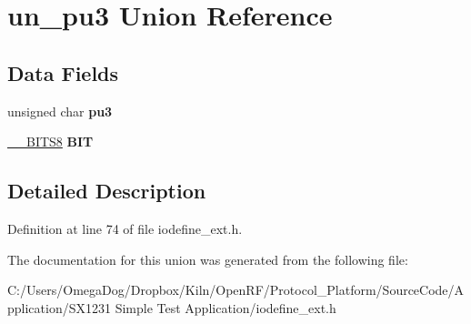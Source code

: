 \hypertarget{unionun__pu3}{\section{un\-\_\-pu3 Union Reference}
\label{unionun__pu3}
}
\subsection*{Data Fields}
\begin{DoxyCompactItemize}
\item 
\hypertarget{unionun__pu3_adb430128d0ebad9976440e08346e2280}{unsigned char {\bfseries pu3}}\label{unionun__pu3_adb430128d0ebad9976440e08346e2280}

\item 
\hypertarget{unionun__pu3_aac741832d190ccc6afff361975958412}{\hyperlink{struct_____b_i_t_s8}{\-\_\-\-\_\-\-B\-I\-T\-S8} {\bfseries B\-I\-T}}\label{unionun__pu3_aac741832d190ccc6afff361975958412}

\end{DoxyCompactItemize}


\subsection{Detailed Description}


Definition at line 74 of file iodefine\-\_\-ext.\-h.



The documentation for this union was generated from the following file\-:\begin{DoxyCompactItemize}
\item 
C\-:/\-Users/\-Omega\-Dog/\-Dropbox/\-Kiln/\-Open\-R\-F/\-Protocol\-\_\-\-Platform/\-Source\-Code/\-Application/\-S\-X1231 Simple Test Application/iodefine\-\_\-ext.\-h\end{DoxyCompactItemize}
